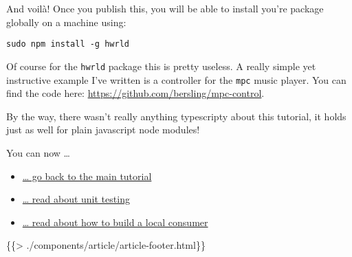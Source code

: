 \documentclass[]{article}
\providecommand{\tightlist}{%
  \setlength{\itemsep}{0pt}\setlength{\parskip}{0pt}}
\begin{document}
And voilà! Once you publish this, you will be able to install you're
package globally on a machine using:

\begin{verbatim}
sudo npm install -g hwrld
\end{verbatim}

Of course for the \texttt{hwrld} package this is pretty useless. A
really simple yet instructive example I've written is a controller for
the \texttt{mpc} music player. You can find the code here:
\url{https://github.com/bersling/mpc-control}.

By the way, there wasn't really anything typescripty about this
tutorial, it holds just as well for plain javascript node modules!

You can now \ldots{}

\begin{itemize}
\tightlist
\item
  \href{}{\ldots{} go back to the main tutorial}
\item
  \href{./unit-testing}{\ldots{} read about unit testing}
\item
  \href{./local-consumer}{\ldots{} read about how to build a local
  consumer}
\end{itemize}

\{\{\textgreater{} ./components/article/article-footer.html\}\}
\end{document}
